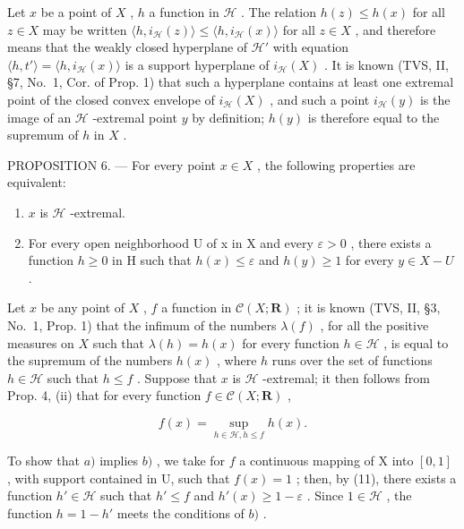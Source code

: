 Let \(x\) be a point of \(X\) , \(h\) a function in \(\mathcal{H}\) . The relation \(h(z) \leqslant h(x)\) for all \(z \in X\) may be written \(\langle h, i_{\mathcal{H}}(z) \rangle \leqslant \langle h, i_{\mathcal{H}}(x) \rangle\) for all \(z \in X\) , and therefore means that the weakly closed hyperplane of \(\mathcal{H}'\) with equation \(\langle h, t' \rangle = \langle h, i_{\mathcal{H}}(x) \rangle\) is a support hyperplane of \(i_{\mathcal{H}}(X)\) . It is known (TVS, II, §7, No.~1, Cor. of Prop. 1) that such a hyperplane contains at least one extremal point of the closed convex envelope of \(i_{\mathcal{H}}(X)\) , and such a point \(i_{\mathcal{H}}(y)\) is the image of an \(\mathcal{H}\) -extremal point \(y\) by definition; \(h(y)\) is therefore equal to the supremum of \(h\) in \(X\) .

PROPOSITION 6. --- For every point \(x \in X\) , the following properties are equivalent:

\begin{enumerate}
\def\labelenumi{\alph{enumi})}
\item
  \(x\) is \(\mathcal{H}\) -extremal.
\item
  For every open neighborhood U of x in X and every \(\varepsilon > 0\) , there exists a function \(h \geqslant 0\) in H such that \(h(x) \leqslant \varepsilon\) and \(h(y) \geqslant 1\) for every \(y \in X - U\) .
\end{enumerate}

Let \(x\) be any point of \(X\) , \(f\) a function in \(\mathcal{C}(X; \mathbf{R})\) ; it is known (TVS, II, §3, No.~1, Prop. 1) that the infimum of the numbers \(\lambda(f)\) , for all the positive measures on \(X\) such that \(\lambda(h) = h(x)\) for every function \(h \in \mathcal{H}\) , is equal to the supremum of the numbers \(h(x)\) , where \(h\) runs over the set of functions \(h \in \mathcal{H}\) such that \(h \leqslant f\) . Suppose that \(x\) is \(\mathcal{H}\) -extremal; it then follows from Prop. 4, (ii) that for every function \(f \in \mathcal{C}(X; \mathbf{R})\) ,

\[
f (x) = \sup _ {h \in \mathscr {H}, h \leqslant f} h (x).\tag{11}
\]

To show that \(a)\) implies \(b)\) , we take for \(f\) a continuous mapping of X into \([0,1]\) , with support contained in U, such that \(f(x)=1\) ; then, by (11), there exists a function \(h'\in\mathscr{H}\) such that \(h'\leqslant f\) and \(h'(x)\geqslant 1-\varepsilon\) . Since \(1\in\mathscr{H}\) , the function \(h=1-h'\) meets the conditions of \(b)\) .

